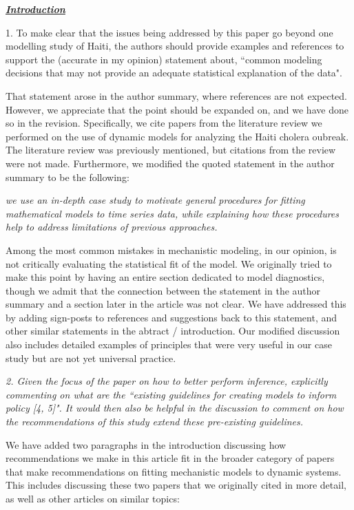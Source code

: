 \documentclass[11pt]{article}
\newcommand\report[1]{{\color{mygreen} \vspace{1mm}\hspace{0.25in}\parbox{6in}{\em #1}}}
\newcommand\article[1]{{\color{blue} \vspace{1mm}\hspace{0.25in}\parbox{6in}{\em #1}}}
\begin{document}
\report{
  \textbf{\underline{Introduction}}

1.  To make clear that the issues being addressed by this paper go beyond one modelling study of Haiti, the authors should provide examples and references to support the (accurate in my opinion) statement about, ``common modeling decisions that may not provide an adequate statistical explanation of the data".
}

That statement arose in the author summary, where references are not expected.
However, we appreciate that the point should be expanded on, and we have done so in the revision. Specifically, we cite papers from the literature review we performed on the use of dynamic models for analyzing the Haiti cholera oubreak. The literature review was previously mentioned, but citations from the review were not made. Furthermore, we modified the quoted statement in the author summary to be the following:

\article{we use an in-depth case study to motivate general procedures for fitting mathematical models to time series data, while explaining how these procedures help to address limitations of previous approaches.}

Among the most common mistakes in mechanistic modeling, in our opinion, is not critically evaluating the statistical fit of the model.
We originally tried to make this point by having an entire section dedicated to model diagnostics, though we admit that the connection between the statement in the author summary and a section later in the article was not clear.
We have addressed this by adding sign-posts to references and suggestions back to this statement, and other similar statements in the abtract / introduction.
Our modified discussion also includes detailed examples of principles that were very useful in our case study but are not yet universal practice.

\report{2.
  Given the focus of the paper on how to better perform inference, explicitly commenting on what are the ``existing guidelines for creating models to inform policy [4, 5]". It would then also be helpful in the discussion to comment on how the recommendations of this study extend these pre-existing guidelines.
}

We have added two paragraphs in the introduction discussing how recommendations we make in this article fit in the broader category of papers that make recommendations on fitting mechanistic models to dynamic systems. This includes discussing these two papers that we originally cited in more detail, as well as other articles on similar topics:
\end{document}
